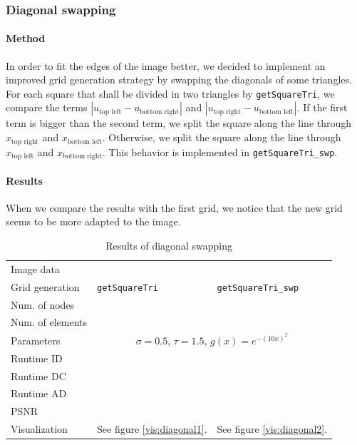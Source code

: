 \documentclass{report}
\begin{document}
\subsubsection{Diagonal swapping}
\paragraph{Method}
In order to fit the edges of the image better, we decided to implement an improved grid generation strategy by swapping the diagonals of some triangles. For each square that shall be divided in two triangles by \texttt{getSquareTri}, we compare the terms $|u_\text{top left} - u_\text{bottom right}|$ and $|u_\text{top right} - u_\text{bottom left}|$. If the first term is bigger than the second term, we split the square along the line through $x_\text{top right}$ and $x_\text{bottom left}$. Otherwise, we split the square along the line through $x_\text{top left}$ and $x_\text{bottom right}$. This behavior is implemented in \texttt{getSquareTri\_swp}.

\paragraph{Results}

When we compare the results with the first grid, we notice that the new grid seems to be more adapted to the image.

\begin{table}[h]
	\centering
	\begin{tabular}{|lll}
		Image data & \\
		Grid generation & \texttt{getSquareTri} & \texttt{getSquareTri\_swp} \\
		Num. of nodes \\
		Num. of elements \\
		Parameters & \multicolumn{2}{c}{$\sigma=0.5$, $\tau=1.5$, $g(x) = e^{-(10 x)^2}$} \\
		Runtime ID \\
		Runtime DC \\
		Runtime AD \\
		PSNR \\
		Visualization & See figure \ref{vis:diagonal1}. & See figure \ref{vis:diagonal2}. \\
	\end{tabular}
	\caption{Results of diagonal swapping}
	\label{res:efficient}
\end{table}
\end{document}
